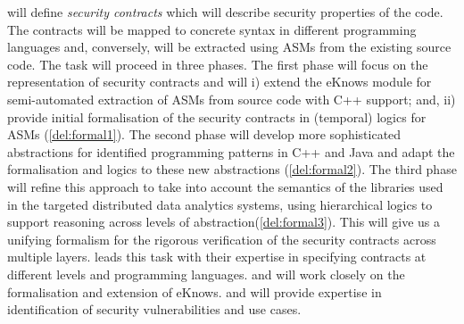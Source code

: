 \begin{Workpackage}{\thewpno}
\begin{Task}
\theTask{} will define \emph{security contracts} which will describe security properties of the code. The contracts will be mapped to concrete syntax in different
programming languages and, conversely, will be extracted using ASMs from the existing source code. The task will proceed in three phases.
The first phase will focus on the representation of security contracts and will i) extend the \textsf{eKnows} module for semi-automated extraction of ASMs from source code with C++ support; and, ii) provide initial formalisation of the security contracts in (temporal) logics for ASMs (\ref{del:formal1}). The second phase will develop more sophisticated abstractions for identified programming patterns in C++ and Java and adapt the formalisation and logics to these new abstractions (\ref{del:formal2}). The third phase will refine this approach to take into account the semantics of the libraries used in the targeted distributed data analytics systems, using hierarchical logics to support reasoning across levels of abstraction(\ref{del:formal3}). This will give us a unifying formalism for the rigorous verification of the security contracts across multiple layers.
\UCM leads this task with their expertise in specifying contracts at different levels and programming languages. \SA and \SCCHshort will work closely on the formalisation and extension of \textsf{eKnows}. \IBMshort and \SOPRAshort will provide expertise in identification of security vulnerabilities and use cases.
\end{Task}

\begin{Task}
\TaskResults{%
\ref{del:formal1},
\ref{del:formal2},
\ref{del:formal3}
}
\TaskHeader{}


\end{Task}
\end{Workpackage}
